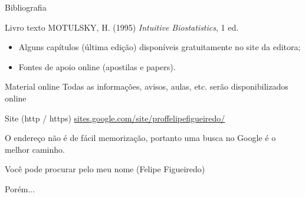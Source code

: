 \documentclass{beamer}
\begin{document}

\begin{frame}{\scriptsize Bibliografia}
  \begin{block}{Livro texto}
    \footnotesize
    MOTULSKY, H. (1995) {\em Intuitive Biostatistics}, 1 ed.
  \end{block}
  \bigskip
  \begin{itemize}
    \scriptsize
  \item Alguns capítulos (última edição) disponíveis gratuitamente no site da editora;
  \item Fontes de apoio online (apostilas e papers).
  \end{itemize}
\end{frame}

\begin{frame}{\scriptsize Material online}
  \footnotesize
  Todas as informações, avisos, aulas, etc. serão disponibilizados online
  \begin{block}{Site (http / https)}
    \footnotesize
    \url{sites.google.com/site/proffelipefigueiredo/}
  \end{block}

  \bigskip
  O endereço não é de fácil memorização, portanto uma busca no Google é o melhor caminho.

  \bigskip
  Você pode procurar pelo meu nome (Felipe Figueiredo)

  \bigskip
  \bigskip
  Porém...
\end{frame}
\end{document}
